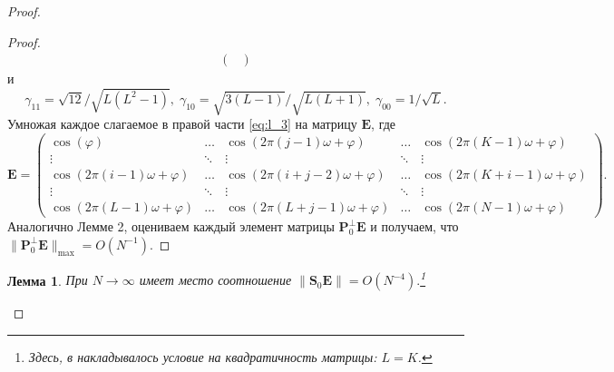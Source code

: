 \documentclass[specialist,
substylefile = spbu_report.rtx,
subf,href,colorlinks=true, 12pt]{disser}
\newtheorem{lemma}{Лемма}
\begin{document}
\begin{proof}
\begin{proof}
\begin{align*}
\begin{pmatrix}
				\end{pmatrix}
			\end{align*}
			и
			\begin{equation*}
				\gamma_{11}=\sqrt{12}/\sqrt{L(L^2-1)},\;\gamma_{10}=\sqrt{3(L-1)}/\sqrt{L(L+1)},\;\gamma_{00}=1/\sqrt{L}.
			\end{equation*}
			Умножая каждое слагаемое в правой части \eqref{eq:l_3} на матрицу $\mathbf{E}$, где
			\begin{equation*}
				\mathbf{E}=
				\begin{pmatrix}
					\cos(\varphi)&\dots&\cos(2\pi(j-1)\omega + \varphi)&\dots&\cos(2\pi(K-1)\omega + \varphi)\\
					\vdots&\ddots&\vdots&\ddots&\vdots\\
					\cos(2\pi(i-1)\omega + \varphi)&\dots&\cos(2\pi(i+j-2)\omega + \varphi)&\dots&\cos(2\pi(K+i-1)\omega+\varphi)\\
					\vdots&\ddots&\vdots&\ddots&\vdots\\
					\cos(2\pi(L-1)\omega+\varphi)&\dots&\cos(2\pi(L+j-1)\omega+\varphi)&\dots&\cos(2\pi(N-1)\omega + \varphi)
				\end{pmatrix}
				.
			\end{equation*}
			Аналогично Лемме 2, оцениваем каждый элемент матрицы $\mathbf{P}_0^\bot\mathbf{E}$ и получаем, что \linebreak $\|\mathbf{P}_0^\bot\mathbf{E}\|_{\max}=O(N^{-1})$.
		\end{proof}
		
		\begin{lemma}
			При $N\rightarrow\infty$ имеет место соотношение $\|\mathbf{S}_0\mathbf{E}\|=O(N^{-4}).$\footnote{Здесь, в \cite{ZNekrutkin} накладывалось условие на квадратичность матрицы: $L = K$.}
		\end{lemma}
		

\end{proof}
\end{document}
